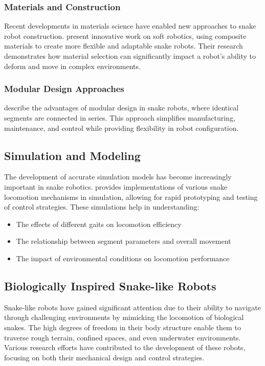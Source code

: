 \documentclass[12pt,a4paper]{report}
\begin{document}
\subsubsection{Materials and Construction}
Recent developments in materials science have enabled new approaches to snake robot construction. \textcite{wang-2023} present innovative work on soft robotics, using composite materials to create more flexible and adaptable snake robots. Their research demonstrates how material selection can significantly impact a robot's ability to deform and move in complex environments.

\subsubsection{Modular Design Approaches}
\textcite{wang-2016} describe the advantages of modular design in snake robots, where identical segments are connected in series. This approach simplifies manufacturing, maintenance, and control while providing flexibility in robot configuration.

\subsection{Simulation and Modeling}
The development of accurate simulation models has become increasingly important in snake robotics. \textcite{yogesh2023snake} provides implementations of various snake locomotion mechanisms in simulation, allowing for rapid prototyping and testing of control strategies. These simulations help in understanding:
\begin{itemize}
    \item The effects of different gaits on locomotion efficiency
    \item The relationship between segment parameters and overall movement
    \item The impact of environmental conditions on locomotion performance
\end{itemize}
\subsection{Biologically Inspired Snake-like Robots}

Snake-like robots have gained significant attention due to their ability to navigate through challenging environments by mimicking the locomotion of biological snakes. The high degrees of freedom in their body structure enable them to traverse rough terrain, confined spaces, and even underwater environments. Various research efforts have contributed to the development of these robots, focusing on both their mechanical design and control strategies.
\end{document}

